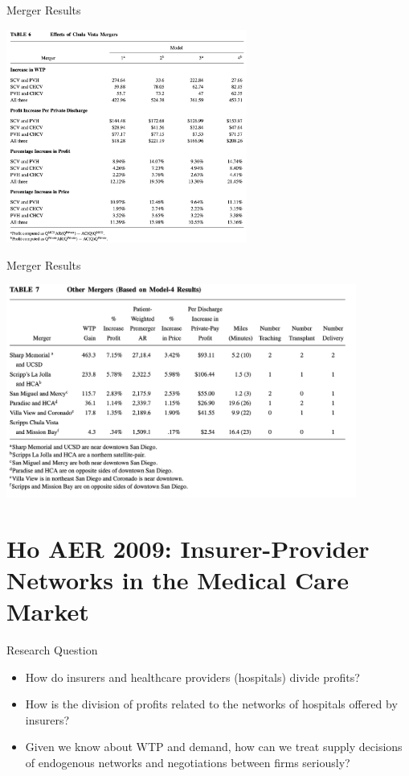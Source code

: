 \documentclass[xcolor=pdftex,dvipsnames,table,mathserif,aspectratio=169]{beamer}
\begin{document}
\begin{frame}{Merger Results}
\begin{center}
\includegraphics[height=7cm]{./resources/cds_table6.png}
\end{center}
\end{frame}



\begin{frame}{Merger Results}
\begin{center}
\includegraphics[height=7cm]{./resources/cds_table7.png}
\end{center}
\end{frame}


\section{Ho AER 2009: Insurer-Provider Networks in the Medical Care Market}

\begin{frame}{Research Question}
\begin{itemize}
\item How do insurers and healthcare providers (hospitals) divide profits?
\item How is the division of profits related to the networks of hospitals offered by insurers?
\item Given we know about WTP and \alert{demand}, how can we treat \alert{supply} decisions of endogenous networks and negotiations between firms seriously?
\end{itemize}
\end{frame}
\end{document}
